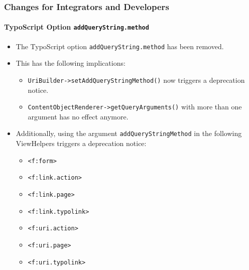 %

\begin{frame}[fragile]
	\frametitle{Changes for Integrators and Developers}
	\framesubtitle{TypoScript Option \texttt{addQueryString.method}}

	\begin{itemize}
		\item The TypoScript option \texttt{addQueryString.method} has been removed.
		\item This has the following implications:

			\begin{itemize}\smaller
				\item \texttt{UriBuilder->setAddQueryStringMethod()} now triggers a deprecation notice.
				\item \texttt{ContentObjectRenderer->getQueryArguments()} with more than one argument has no effect anymore.
			\end{itemize}\normalsize

		\item Additionally, using the argument \texttt{addQueryStringMethod} in
			the following ViewHelpers triggers a deprecation notice:

			\begin{itemize}\smaller
				\item \texttt{<f:form>}
				\item \texttt{<f:link.action>}
				\item \texttt{<f:link.page>}
				\item \texttt{<f:link.typolink>}
				\item \texttt{<f:uri.action>}
				\item \texttt{<f:uri.page>}
				\item \texttt{<f:uri.typolink>}
			\end{itemize}\normalsize

	\end{itemize}

\end{frame}

